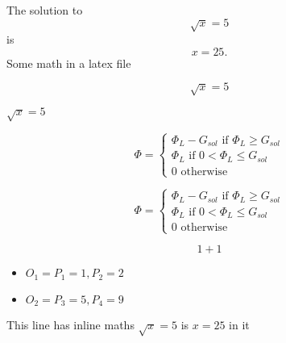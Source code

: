 \documentclass{article}
\begin{document}
The solution to \[\sqrt{x} = 5\] is \[x=25.\]
Some math in a latex file


\[\sqrt{x} = 5\]

\(\sqrt{x} = 5\)

$$
\Phi = \begin{cases}
\Phi_L - G_{sol} \text{ if } \Phi_L \geq G_{sol}\\
\Phi_L \text{ if }  0 <\Phi_L \leq G_{sol}\\
0 \text{ otherwise }
\end{cases}
$$

\begin{equation}
\Phi = \begin{cases}
\Phi_L - G_{sol} \text{ if } \Phi_L \geq G_{sol}\\
\Phi_L \text{ if }  0 <\Phi_L \leq G_{sol}\\
0 \text{ otherwise }
\end{cases}
\end{equation}



\begin{equation}
  1+1
\end{equation}


\begin{itemize}
\item $O_1 = {P_1 = {1}, P_2 = {2}}$
\item $O_2 = {P_3 = {5}, P_4 = {9}}$
\end{itemize}


This line has inline maths $\sqrt{x} = 5$ is $x=25$ in it
\end{document}
